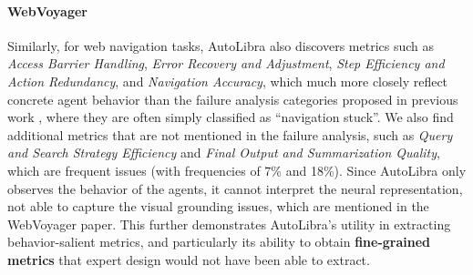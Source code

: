 \paragraph{WebVoyager}
Similarly, for web navigation tasks, AutoLibra also discovers metrics such as \textit{Access
Barrier Handling}, \textit{Error Recovery and Adjustment}, \textit{Step
Efficiency and Action Redundancy}, and \textit{Navigation Accuracy}, which much more
closely reflect concrete agent behavior than the failure analysis categories proposed
in previous work \citep{he2024webvoyager,zhou2024proposeragentevaluatorpaeautonomousskilldiscovery},
where they are often simply classified as ``navigation stuck''. We also find
additional metrics that are not mentioned in the failure analysis, such as \textit{Query
and Search Strategy Efficiency} and \textit{Final Output and Summarization
Quality}, which are frequent issues (with frequencies of 7\% and 18\%). Since AutoLibra
only observes the behavior of the agents, it cannot interpret the neural
representation, not able to capture the visual grounding issues, which are
mentioned in the WebVoyager paper. This further demonstrates AutoLibra's utility
in extracting behavior-salient metrics, and particularly its
ability to obtain \textbf{fine-grained metrics} that expert design would not have
been able to extract.